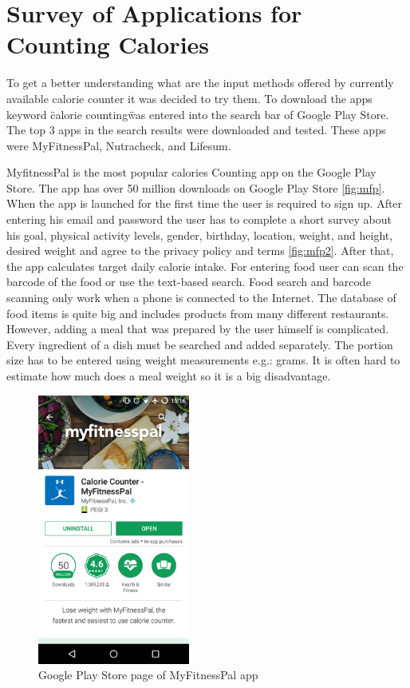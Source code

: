 \section{Survey of Applications for Counting Calories}

To get a better understanding what are the input methods offered by currently available calorie counter it was decided to try them. To download the apps keyword \"calorie counting\" was entered into the search bar of Google Play Store. The top 3 apps in the search results were downloaded and tested. These apps were MyFitnessPal, Nutracheck, and Lifesum.

MyfitnessPal is the most popular calories Counting app on the Google Play Store. The app has over 50 million downloads on Google Play Store \autoref{fig:mfp}. When the app is launched for the first time the user is required to sign up. After entering his email and password the user has to complete a short survey about his goal, physical activity levels, gender, birthday, location, weight, and height, desired weight and agree to the privacy policy and terms \autoref{fig:mfp2}. After that, the app calculates target daily calorie intake. For entering food user can scan the barcode of the food or use the text-based search. Food search and barcode scanning only work when a phone is connected to the Internet.  The database of food items is quite big and includes products from many different restaurants. However,  adding a meal that was prepared by the user himself is complicated. Every ingredient of a dish must be searched and added separately.  The portion size has to be entered using weight measurements e.g.:  grams. It is often hard to estimate how much does a meal weight so it is a big disadvantage.
 
\begin{figure}[ht]
\centering
\includegraphics[width=5cm,scale=0.5]{Figures/2/mfp1.png}
\caption{Google Play Store page of MyFitnessPal app}
\label{fig:mfp}
\end{figure}

